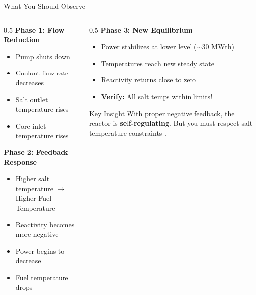 \documentclass[aspectratio=169]{beamer}
\begin{document}
\begin{frame}[allowframebreaks]{What You Should Observe}
    \begin{columns}
        \begin{column}{0.5\textwidth}
            \textbf{Phase 1: Flow Reduction}
            \begin{itemize}
                \item Pump shuts down
                \item Coolant flow rate decreases
                \item Salt outlet temperature rises
                \item Core inlet temperature rises
            \end{itemize}

            \vspace{1em}
            \textbf{Phase 2: Feedback Response}
            \begin{itemize}
                \item Higher salt temperature $\rightarrow$ Higher Fuel Temperature
                \item Reactivity becomes more negative
                \item Power begins to decrease
                \item Fuel temperature drops
            \end{itemize}
        \end{column}
        \begin{column}{0.5\textwidth}
            \textbf{Phase 3: New Equilibrium}
            \begin{itemize}
                \item Power stabilizes at lower level ($\sim$30 MWth)
                \item Temperatures reach new steady state
                \item Reactivity returns close to zero
                \item \textbf{Verify:} All salt temps within limits!
            \end{itemize}

            \vspace{1em}
            \begin{exampleblock}{Key Insight}
                With proper negative feedback, the reactor is \textbf{self-regulating}. But you must respect salt temperature constraints \cite{zhang2024load}.
            \end{exampleblock}
        \end{column}
    \end{columns}
\end{frame}
\end{document}
